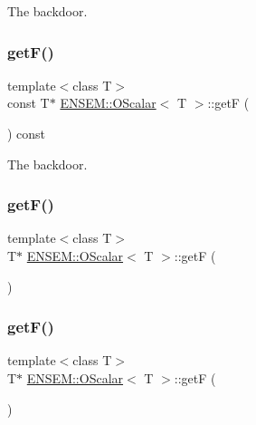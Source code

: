 The backdoor. 

\mbox{\label{classENSEM_1_1OScalar_a8e87e97e45239d934b0d141dcf9b92d7}} 
\subsubsection{\texorpdfstring{getF()}{getF()}\hspace{0.1cm}{\footnotesize\ttfamily [2/4]}}
{\footnotesize\ttfamily template$<$class T$>$ \\
const T$\ast$ \mbox{\hyperlink{classENSEM_1_1OScalar}{E\+N\+S\+E\+M\+::\+O\+Scalar}}$<$ T $>$\+::getF (\begin{DoxyParamCaption}{ }\end{DoxyParamCaption}) const\hspace{0.3cm}{\ttfamily [inline]}}



The backdoor. 

\mbox{\label{classENSEM_1_1OScalar_a040999918115f255a411fd96ad87663f}} 
\subsubsection{\texorpdfstring{getF()}{getF()}\hspace{0.1cm}{\footnotesize\ttfamily [3/4]}}
{\footnotesize\ttfamily template$<$class T$>$ \\
T$\ast$ \mbox{\hyperlink{classENSEM_1_1OScalar}{E\+N\+S\+E\+M\+::\+O\+Scalar}}$<$ T $>$\+::getF (\begin{DoxyParamCaption}{ }\end{DoxyParamCaption})\hspace{0.3cm}{\ttfamily [inline]}}

\mbox{\label{classENSEM_1_1OScalar_a040999918115f255a411fd96ad87663f}} 
\subsubsection{\texorpdfstring{getF()}{getF()}\hspace{0.1cm}{\footnotesize\ttfamily [4/4]}}
{\footnotesize\ttfamily template$<$class T$>$ \\
T$\ast$ \mbox{\hyperlink{classENSEM_1_1OScalar}{E\+N\+S\+E\+M\+::\+O\+Scalar}}$<$ T $>$\+::getF (\begin{DoxyParamCaption}{ }\end{DoxyParamCaption})\hspace{0.3cm}{\ttfamily [inline]}}

